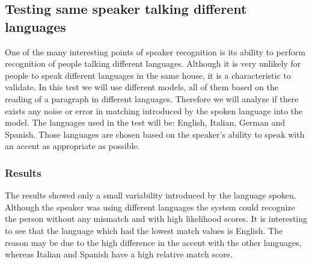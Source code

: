 \subsection{Testing same speaker talking different languages}

One of the many interesting points of speaker recognition is its ability to perform
recognition of people talking different languages. Although it is very unlikely
for people to speak different languages in the same house, it is a characteristic to
validate. In this test we will use different models, all of them based on the reading of a
paragraph in different languages. Therefore we will analyze if there exists any noise or error
in matching introduced by the spoken language into the model. The languages used in the test will be:
English, Italian, German and Spanish. Those languages are chosen based on the speaker's ability to
speak with an accent as appropriate as possible.



\subsubsection{Results}

The results showed only a small variability introduced by the language spoken. Although
the speaker was using different languages the system could recognize the person without
any mismatch and with high likelihood scores. It is interesting to see that the language
which had the lowest match values is English. The reason may be due to the high difference
in the accent with the other languages, whereas Italian and Spanish have a high relative
match score.
\begin{center}


\end{center}



